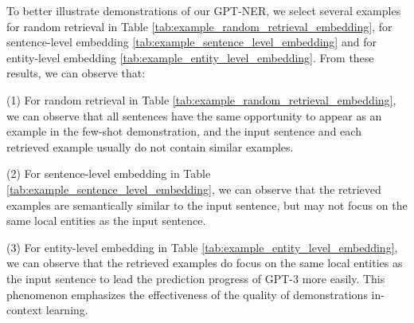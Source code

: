 \documentclass[11pt]{article}
\begin{document}
To better illustrate demonstrations of our GPT-NER, we select several examples for random retrieval in Table \ref{tab:example_random_retrieval_embedding}, for sentence-level embedding \ref{tab:example_sentence_level_embedding} and for entity-level embedding \ref{tab:example_entity_level_embedding}. From these results, we can observe that:

(1) For random retrieval in Table \ref{tab:example_random_retrieval_embedding}, we can observe that all sentences have the same opportunity to appear as an example in the few-shot demonstration, and the input sentence and each retrieved example usually do not contain similar examples. 

(2) For sentence-level embedding in Table \ref{tab:example_sentence_level_embedding}, we can observe that the retrieved examples are semantically similar to the input sentence, but may not focus on the same local entities as the input sentence.

(3) For entity-level embedding in Table \ref{tab:example_entity_level_embedding}, we can observe that the retrieved examples do focus on the same local entities as the input sentence to lead the prediction progress of GPT-3 more easily. This phenomenon emphasizes the effectiveness of the quality of demonstrations in-context learning.

\end{document}
